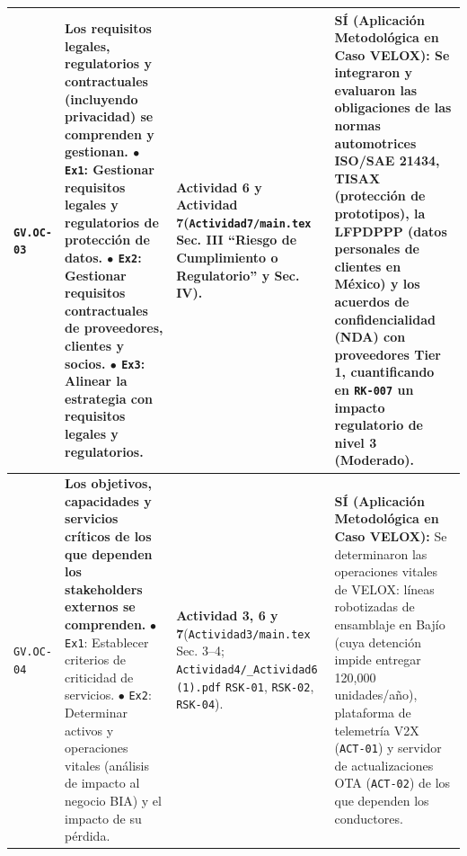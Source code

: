 \documentclass[letterpaper,11pt]{article}
\begin{document}
\begin{longtable}{|C{1.5cm}|L{5.3cm}|L{4.3cm}|L{5.8cm}|}
\texttt{GV.OC-03} &
\textbf{Los requisitos legales, regulatorios y contractuales (incluyendo privacidad) se comprenden y gestionan.}\newline
$\bullet$ \texttt{Ex1}: Gestionar requisitos legales y regulatorios de protección de datos.\newline
$\bullet$ \texttt{Ex2}: Gestionar requisitos contractuales de proveedores, clientes y socios.\newline
$\bullet$ \texttt{Ex3}: Alinear la estrategia con requisitos legales y regulatorios. &
\textbf{Actividad 6 y Actividad 7}\newline (\texttt{Actividad7/main.tex} Sec. III ``Riesgo de Cumplimiento o Regulatorio'' y Sec. IV). &
\textbf{SÍ (Aplicación Metodológica en Caso VELOX):}\newline
Se integraron y evaluaron las obligaciones de las normas automotrices \textbf{ISO/SAE 21434}, \textbf{TISAX} (protección de prototipos), la \textbf{LFPDPPP} (datos personales de clientes en México) y los acuerdos de confidencialidad (\textbf{NDA}) con proveedores Tier 1, cuantificando en \texttt{RK-007} un impacto regulatorio de nivel 3 (Moderado). \\
\hline

\texttt{GV.OC-04} &
\textbf{Los objetivos, capacidades y servicios críticos de los que dependen los stakeholders externos se comprenden.}\newline
$\bullet$ \texttt{Ex1}: Establecer criterios de criticidad de servicios.\newline
$\bullet$ \texttt{Ex2}: Determinar activos y operaciones vitales (análisis de impacto al negocio BIA) y el impacto de su pérdida. &
\textbf{Actividad 3, 6 y 7}\newline (\texttt{Actividad3/main.tex} Sec. 3--4; \texttt{Actividad4/\_Actividad6 (1).pdf} \texttt{RSK-01}, \texttt{RSK-02}, \texttt{RSK-04}). &
\textbf{SÍ (Aplicación Metodológica en Caso VELOX):}\newline
Se determinaron las operaciones vitales de VELOX: líneas robotizadas de ensamblaje en Bajío (cuya detención impide entregar 120,000 unidades/año), plataforma de telemetría V2X (\texttt{ACT-01}) y servidor de actualizaciones OTA (\texttt{ACT-02}) de los que dependen los conductores. \\
\hline


\end{longtable}
\end{document}

